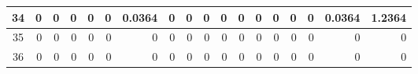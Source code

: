 \begin{table}[ht]
\begin{adjustbox}{width = \textwidth, center}
\begin{tabular}{|c|r|r|r|r|r|r|r|r|r|r|r|r|r|r|r|r|r|}
            \rowcolor[HTML]{FFFFFF} 
            \cellcolor[HTML]{CFE2F3}34                           & 0                                              & 0                                              & 0                                              & 0                                              & 0                                              & \cellcolor[HTML]{8FD2B1}0.0364                 & 0                                              & 0                                               & 0                                               & 0                                               & 0                                               & 0                                               & 0                                               & 0                                               & 0                                               & \cellcolor[HTML]{D9D2E9}0.0364                                                        & \cellcolor[HTML]{D9D2E9}1.2364                                                            \\ \hline
            \rowcolor[HTML]{FFFFFF} 
            \cellcolor[HTML]{CFE2F3}35                           & 0                                              & 0                                              & 0                                              & 0                                              & 0                                              & 0                                              & 0                                              & 0                                               & 0                                               & 0                                               & 0                                               & 0                                               & 0                                               & 0                                               & 0                                               & \cellcolor[HTML]{D9D2E9}0                                                             & \cellcolor[HTML]{D9D2E9}0                                                                 \\ \hline
            \rowcolor[HTML]{FFFFFF} 
            \cellcolor[HTML]{CFE2F3}36                           & 0                                              & 0                                              & 0                                              & 0                                              & 0                                              & 0                                              & 0                                              & 0                                               & 0                                               & 0                                               & 0                                               & 0                                               & 0                                               & 0                                               & 0                                               & \cellcolor[HTML]{D9D2E9}0                                                             & \cellcolor[HTML]{D9D2E9}0                                                                 \\ \hline

\end{tabular}
\end{adjustbox}
\end{table}
